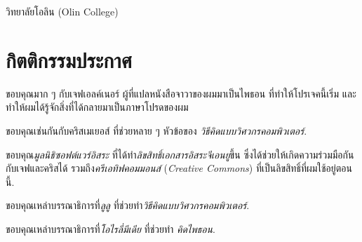 \hfill วิทยาลัยโอลิน (Olin College) \\

\section*{กิตติกรรมประกาศ}


ขอบคุณมาก ๆ กับเจฟเอลค์เนอร์ ผู้ที่แปลหนังสือจาวาของผมมาเป็นไพธอน
ที่ทำให้โปรเจคนี้เริ่ม
และทำให้ผมได้รู้จักสิ่งที่ได้กลายมาเป็นภาษาโปรดของผม


ขอบคุณเช่นกันกับคริสเมเยอส์
ที่ช่วยหลาย ๆ หัวข้อของ
\textit{วิธีคิดแบบวิศวกรคอมพิวเตอร์}.


ขอบคุณ\textit{มูลนิธิซอฟต์แวร์อิสระ} 
ที่ได้ทำ\textit{ลิขสิทธิ์เอกสารอิสระจีเอนยู}ขึ้น
ซึ่งได้ช่วยให้เกิดความร่วมมือกันกับเจฟและคริสได้
รวมถึง\textit{ครีเอทิฟคอมมอนส์} (\textit{Creative Commons}) ที่เป็นลิขสิทธิ์ที่ผมใช้อยู่ตอนนี้.


ขอบคุณเหล่าบรรณาธิการที่\textit{ลูลู}
ที่ช่วยทำ\textit{วิธีคิดแบบวิศวกรคอมพิวเตอร์}.


ขอบคุณเหล่าบรรณาธิการที่\textit{โอไรลี่มีเดีย}
ที่ช่วยทำ \textit{คิดไพธอน}.



